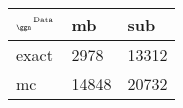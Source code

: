 \begin{tabular}{lll}
    \toprule
    $_{\text{\tiny{\ggn}}}$$^{\text{\tiny{Data}}}$ & mb & sub \\
    \midrule
    exact & 2978
              & 13312 \\
    mc   & 14848
              & 20732 \\
    \bottomrule
\end{tabular}